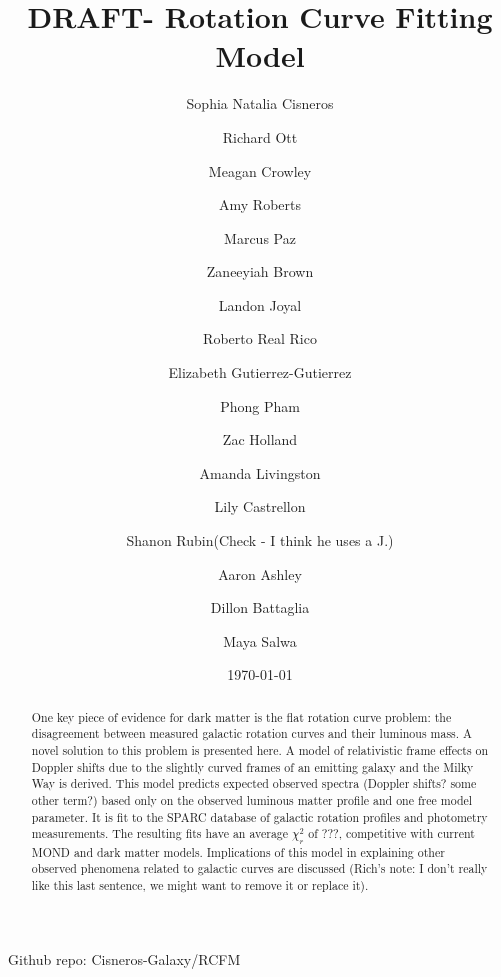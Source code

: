 \documentclass[reprint,%
 amsmath,amssymb,
 aps,
]{revtex4-1}
\begin{document}

\title{DRAFT- Rotation Curve Fitting Model }%


 

\author{Sophia Natalia Cisneros}
  \author{Richard Ott}%
 \author{ Meagan Crowley}
\email{ }
%
 \author{ Amy Roberts}
\email{ }
%
\author{Marcus Paz}
\author{Zaneeyiah Brown}
\author{Landon Joyal}
\author{Roberto Real Rico}
\author{Elizabeth Gutierrez-Gutierrez}
\author{ Phong Pham}
\author{Zac Holland}
\author{Amanda Livingston}
\author{Lily Castrellon}
\author{Shanon Rubin(Check - I think he uses a J.)}
\author{Aaron Ashley}
\author{Dillon Battaglia}
\author{Maya Salwa}

%
 
 
\date{\today}%
\begin{abstract}
One key piece of evidence for dark matter is the flat rotation curve problem: the disagreement between measured galactic rotation curves and their luminous mass.  A novel solution to this problem is presented here. A model of relativistic frame effects on Doppler shifts due to the slightly curved frames of an emitting galaxy and the Milky Way is derived. This model predicts expected observed spectra (Doppler shifts? some other term?) based only on the observed luminous matter profile and one free model parameter. It is fit to the SPARC database of galactic rotation profiles and photometry measurements. The resulting fits have an average $\chi^2_r$ of ???, competitive with current MOND and dark matter models. Implications of this model in explaining other observed phenomena related to galactic curves are discussed (Rich's note: I don't really like this last sentence, we might want to remove it or replace it).
 \end{abstract}
 
{\color{teal}   Github repo: Cisneros-Galaxy/RCFM     }
\end{document}
